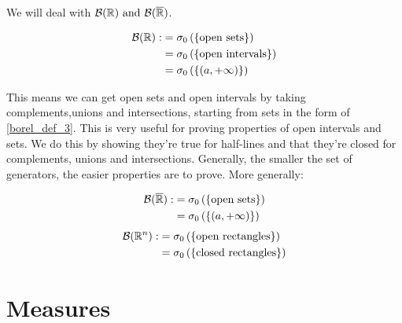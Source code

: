 We will deal with $\mathcal{B}(\mathbb{R}) \text{ and }  \mathcal{B}(\overline{\mathbb{R}})$.\newline
\begin{prp}\leavevmode
    \begin{align}
        \mathcal{B}(\mathbb{R}) :&= \sigma_0 \left( \left\{ \text{open sets} \right\} \right) \nonumber \\
        &=\sigma_0 \left( \left\{ \text{open intervals} \right\} \right) \nonumber \\
        &=\sigma_0 \left( \left\{ (a,+\infty) \right\}\right) \label{borel_def_3}
    \end{align}
\end{prp}
This means we can get open sets and open intervals by taking complements,unions and intersections, starting from sets in the form of \ref{borel_def_3}.\newline
This is very useful for proving properties of open intervals and sets. We do this by showing they're true for half-lines and that they're closed for complements, unions and intersections.\newline
Generally, the smaller the set of generators, the easier properties are to prove.\newline
\newline
More generally:
\begin{prp}
    \begin{align*}
        \mathcal{B}(\mathbb{\overline{R}}) :&= \sigma_0 \left( \left\{ \text{open sets} \right\} \right) \\
        &=\sigma_0 \left( \left\{ (a,+\infty) \right\}\right)
    \end{align*}
    \begin{align*}
        \mathcal{B}(\mathbb{R}^n) :&= \sigma_0 \left( \left\{ \text{open rectangles} \right\} \right) \\
        &=\sigma_0 \left( \left\{ \text{closed rectangles} \right\} \right) \\
    \end{align*}
\end{prp}


\section{Measures} %
\label{sec:measures}

